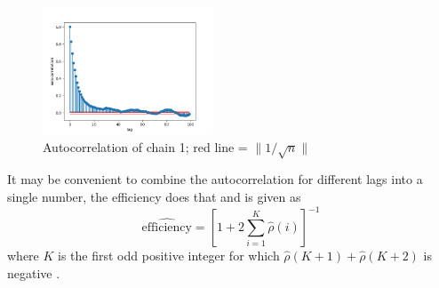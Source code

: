\documentclass[10pt]{proc}
\begin{document}
\begin{figure}[ht]
  \centering
  \includegraphics[width=0.45\textwidth]{acf.png}
  \caption{Autocorrelation of chain 1; red line = $\|{1/\sqrt{n}}\|$}
  \label{fig:acf}
\end{figure}

It may be convenient to combine the autocorrelation for different lags into a single number, the efficiency does that and is given as
\begin{equation}
\widehat{\text{efficiency}}=\left[1+2\sum_{i=1}^K\widehat{\rho}(i)\right]^{-1}
\end{equation}
where $K$ is the first odd positive integer for which $\widehat{\rho}(K + 1) + \widehat{\rho}(K + 2)$ is negative \citep{gelman2014bayesian}.
\end{document}
